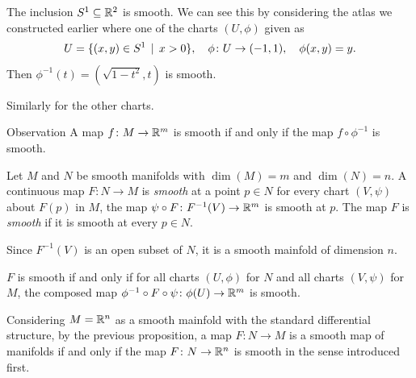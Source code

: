 \begin{frame}
  \begin{example}
    The inclusion $S^1 \subseteq \mathbb R^2$ is smooth.
    We can see this by considering the atlas we constructed earlier where
    one of the charts $(U, \phi)$ given as
    \begin{displaymath}
      U = \{(x,y) \in S^1 \, \mid \, x > 0\}, \quad \phi \colon U \to (-1,1),
      \quad \phi(x, y) = y.
    \end{displaymath}
    Then $\phi^{-1}(t) = (\sqrt{1 - t^2}, t)$ is smooth. 

    Similarly for the other charts.
  \end{example}
\end{frame}
\begin{frame}
  \begin{block}
    {Observation}
    A map $f \colon M \to \mathbb R^m$ is smooth if and only if 
    the map $f \circ \phi^{-1}$ is smooth.
  \end{block}
  \begin{defn}
    Let $M$ and $N$ be smooth manifolds with $\dim(M) = m$ and
    $\dim(N) = n$. A continuous map $F \colon N \to M$ is {\em smooth}
    at a point $p \in N$ for every chart $(V, \psi)$ about $F(p)$ 
    in $M$, the map $\psi \circ F \colon F^{-1}(V) \to \mathbb R^m$
    is smooth at $p$.
    The map $F$ is {\em smooth} if it is smooth at every $p \in N$.
  \end{defn}
  \begin{remark}
    Since $F^{-1}(V)$ is an open subset of $N$, it is a smooth mainfold of 
    dimension $n$.
  \end{remark}
  \begin{remark}
    $F$ is smooth if and only if for all charts $(U, \phi)$ for $N$ and 
    all charts $(V, \psi)$ for $M$, the composed map 
    $\phi^{-1} \circ F \circ \psi \colon \phi(U) \to \mathbb R^m$ is smooth.
  \end{remark}
\end{frame}
\begin{frame}
  \begin{remark}
    Considering $M = \mathbb R^n$ as a smooth mainfold with the standard
    differential structure, by the previous proposition,
    a map $F \colon N \to M$ is a smooth map of manifolds 
    if and only if the map $F \colon N \to \mathbb R^n$ is smooth
    in the sense introduced first.
  \end{remark}
\end{frame}
